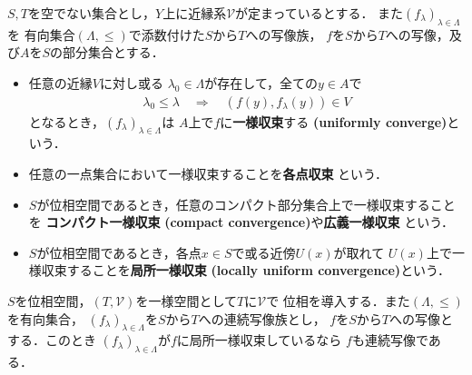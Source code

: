 	\begin{screen}
		\begin{dfn}[一様収束]
			$S,T$を空でない集合とし，$Y$上に近縁系$\mathscr{V}$が定まっているとする．
			また$(f_\lambda)_{\lambda \in \Lambda}$を
			有向集合$(\Lambda,\leq)$で添数付けた$S$から$T$への写像族，
			$f$を$S$から$T$への写像，及び$A$を$S$の部分集合とする．
			\begin{itemize}
				\item 任意の近縁$V$に対し或る
					$\lambda_0 \in \Lambda$が存在して，全ての$y \in A$で
					\begin{align}
						\lambda_0 \leq \lambda \quad \Longrightarrow \quad
						(f(y),f_\lambda(y)) \in V
					\end{align}
					となるとき，$(f_\lambda)_{\lambda \in \Lambda}$は
					$A$上で$f$に{\bf 一様収束}する
					{\bf (uniformly converge)}という．
					
				\item 任意の一点集合において一様収束することを{\bf 各点収束}
					という．
				
				\item $S$が位相空間であるとき，任意のコンパクト部分集合上で一様収束することを
					{\bf コンパクト一様収束}
					{\bf (compact convergence)}や{\bf 広義一様収束}
					という．
					
				\item $S$が位相空間であるとき，各点$x \in S$で或る近傍$U(x)$が取れて
					$U(x)$上で一様収束することを{\bf 局所一様収束}
					{\bf (locally uniform convergence)}という．
			\end{itemize}
		\end{dfn}
	\end{screen}
	
	\begin{screen}
		\begin{thm}[連続写像が局所一様収束するなら極限写像も連続]
			$S$を位相空間，$(T,\mathscr{V})$を一様空間として$T$に$\mathscr{V}$で
			位相を導入する．また$(\Lambda,\leq)$を有向集合，
			$(f_\lambda)_{\lambda \in \Lambda}$を$S$から$T$への連続写像族とし，
			$f$を$S$から$T$への写像とする．このとき
			$(f_\lambda)_{\lambda \in \Lambda}$が$f$に局所一様収束しているなら
			$f$も連続写像である．
		\end{thm}
	\end{screen}
	
